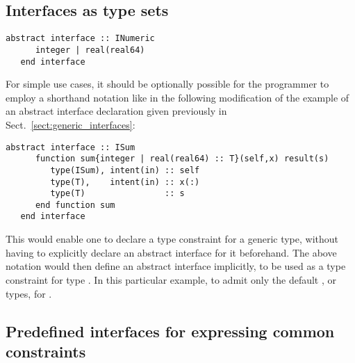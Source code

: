 \documentclass[11pt,oneside]{article}
\newcommand{\code}[1]{{\selectfont\ttfamily{#1}}}
\begin{document}
\subsection{Interfaces as type sets}

\begin{lstlisting}[language=LFortran,style=boxed]
   abstract interface :: INumeric
      integer | real(real64)
   end interface
\end{lstlisting}

For simple use cases, it should be optionally possible for the
programmer to employ a shorthand notation like in the following
modification of the example of an abstract interface declaration
given previously in Sect.~\ref{sect:generic_interfaces}:
\begin{lstlisting}[language=LFortran,style=boxed]
   abstract interface :: ISum
      function sum{integer | real(real64) :: T}(self,x) result(s)
         type(ISum), intent(in) :: self
         type(T),    intent(in) :: x(:)
         type(T)                :: s
      end function sum
   end interface
\end{lstlisting}
This would enable one to declare a type constraint for a generic type,
without having to explicitly declare an abstract interface for it
beforehand. The above notation would then define an abstract interface
implicitly, to be used as a type constraint for type \code{T}. In this
particular example, to admit only the default \code{integer}, or
\code{real(real64)} types, for \code{T}.

\subsection{Predefined interfaces for expressing common constraints}
\end{document}
